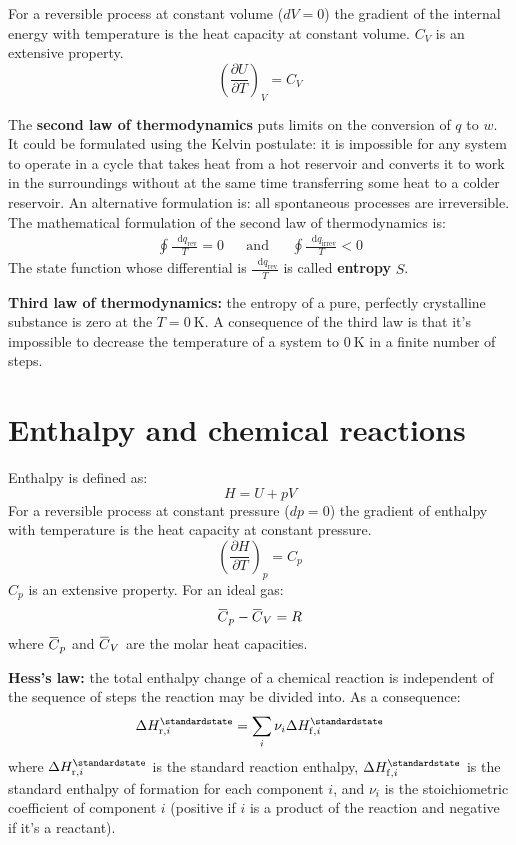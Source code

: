\documentclass[12pt,a4paper]{report}
\newcommand*\diff{\mathop{}\!\mathrm{d}}
\newcommand{\overbar}[1]{\mkern 1.5mu\overline{\mkern-1.5mu#1\mkern-1.5mu}\mkern 1.5mu}
\begin{document}
    For a reversible process at constant volume ($dV=0$) the gradient of the internal energy with temperature is the heat capacity at constant volume. $C_{V}$ is an extensive property.
   \begin{equation*}
   \left(\frac{\partial U}{\partial T}\right)_{V}=C_{V}
   \end{equation*}  
   
   The \textbf{second law of thermodynamics} puts limits on the conversion of $q$ to $w$. It could be formulated using the Kelvin postulate: it is impossible for any system to operate in a cycle that takes heat from a hot reservoir and converts it to work in the surroundings without at the same time transferring some heat to a colder reservoir. An alternative formulation is: all spontaneous processes are irreversible.
   The mathematical formulation of the second law of thermodynamics is:
   \begin{align*}
   \oint\frac{\diff q_{\mathrm{rev}}}{T}=0 &&\mathrm{and}&& \oint\frac{\diff q_{\mathrm{irrev}}}{T}<0
   \end{align*}
   The state function whose differential is $\frac{\diff q_{\mathrm{rev}}}{T}$ is called \textbf{entropy} $S$.
   
   \textbf{Third law of thermodynamics:} the entropy of a pure, perfectly crystalline substance is zero at the $T=0\:\mathrm{K}$. A consequence of the third law is that it's impossible to decrease the temperature of a system to $0\:\mathrm{K}$ in a finite number of steps.
   \section*{Enthalpy and chemical reactions}
   Enthalpy is defined as:
   \begin{equation*}
   H=U+pV
   \end{equation*}
   For a reversible process at constant pressure ($dp=0$) the gradient of enthalpy with temperature is the heat capacity at constant pressure. 
   \begin{equation*}
   \left(\frac{\partial H}{\partial T}\right)_{p}=C_{p}
   \end{equation*}
   $C_{p}$ is an extensive property. 
   For an ideal gas:
   \begin{equation*}
   \overbar{C}_{p}-\overbar{C}_{V}=R
   \end{equation*}
   where $\overbar{C}_{p}$ and $\overbar{C}_{V}$ are the molar heat capacities.
   
   \textbf{Hess's law:} the total enthalpy change of a chemical reaction is independent of the sequence of steps the reaction may be divided into. As a consequence:
   \begin{equation*}
   \Delta H^{\standardstate}_{\mathrm{r}, i}=\sum\limits_{i}\nu_{i}\Delta H^{\standardstate}_{\mathrm{f},i}
   \end{equation*}
   where $\Delta H^{\standardstate}_{\mathrm{r}, i}$ is the standard reaction enthalpy, $\Delta H^{\standardstate}_{\mathrm{f},i}$ is the standard enthalpy of formation for each component $i$, and $\nu_{i}$ is the stoichiometric coefficient of component $i$ (positive if $i$ is a product of the reaction and negative if it's a reactant).
\end{document}
